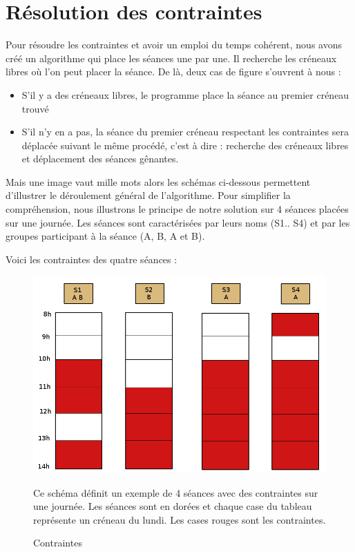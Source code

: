 \documentclass[12pt,a4paper,openany]{memoir}
\begin{document}
\section{Résolution des contraintes}
\par
Pour résoudre les contraintes et avoir un emploi du temps cohérent, nous avons créé un algorithme qui place les séances une par une. Il recherche les créneaux libres où l'on peut placer la séance. De là, deux cas de figure s'ouvrent à nous :
\begin{itemize}
    \item S'il y a des créneaux libres, le programme place la séance au premier créneau trouvé
    \item S'il n'y en a pas, la séance du premier créneau respectant les contraintes sera déplacée suivant le même procédé, c'est à dire : recherche des créneaux libres et déplacement des séances gênantes.
\end{itemize}
\par
Mais une image vaut mille mots alors les schémas ci-dessous permettent d'illustrer le déroulement général de l'algorithme. Pour simplifier la compréhension, nous illustrons le principe de notre solution sur 4 séances placées sur une journée. Les séances sont caractérisées par leurs noms (S1.. S4) et par les groupes participant à la séance (A, B, A et B).

\clearpage
Voici les contraintes des quatre séances :

\begin{figure}[H]
   \begin{minipage}{0.4\linewidth}
      \includegraphics[scale=0.22]{img/Schema/Contrainte.png}
      \caption{Contraintes}
   \end{minipage} \hfill
   \begin{minipage}[c]{0.5\linewidth}
    Ce schéma définit un exemple de 4 séances avec des contraintes sur une journée. Les séances sont en dorées et chaque case du tableau représente un créneau du lundi. Les cases rouges sont les contraintes.
   \end{minipage}
\end{figure}
\end{document}
